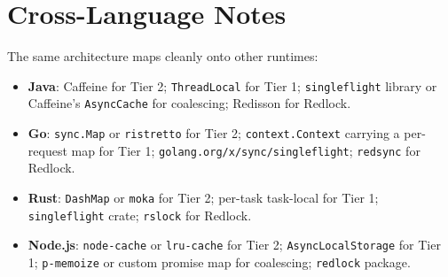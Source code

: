 \section{Cross-Language Notes}
The same architecture maps cleanly onto other runtimes:
\begin{itemize}[leftmargin=*]
    \item \textbf{Java}: Caffeine for Tier 2; \texttt{ThreadLocal} for Tier 1; \texttt{singleflight} library or Caffeine's \texttt{AsyncCache} for coalescing; Redisson for Redlock.
    \item \textbf{Go}: \texttt{sync.Map} or \texttt{ristretto} for Tier 2; \texttt{context.Context} carrying a per-request map for Tier 1; \texttt{golang.org/x/sync/singleflight}; \texttt{redsync} for Redlock.
    \item \textbf{Rust}: \texttt{DashMap} or \texttt{moka} for Tier 2; per-task task-local for Tier 1; \texttt{singleflight} crate; \texttt{rslock} for Redlock.
    \item \textbf{Node.js}: \texttt{node-cache} or \texttt{lru-cache} for Tier 2; \texttt{AsyncLocalStorage} for Tier 1; \texttt{p-memoize} or custom promise map for coalescing; \texttt{redlock} package.
\end{itemize}

